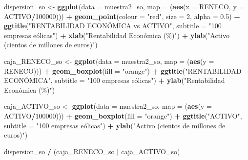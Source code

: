 \documentclass[
]{book}
\newenvironment{Shaded}{\begin{snugshade}}{\end{snugshade}}
\newcommand{\AttributeTok}[1]{\textcolor[rgb]{0.13,0.29,0.53}{#1}}
\newcommand{\DecValTok}[1]{\textcolor[rgb]{0.00,0.00,0.81}{#1}}
\newcommand{\FloatTok}[1]{\textcolor[rgb]{0.00,0.00,0.81}{#1}}
\newcommand{\FunctionTok}[1]{\textcolor[rgb]{0.13,0.29,0.53}{\textbf{#1}}}
\newcommand{\NormalTok}[1]{#1}
\newcommand{\OtherTok}[1]{\textcolor[rgb]{0.56,0.35,0.01}{#1}}
\newcommand{\SpecialCharTok}[1]{\textcolor[rgb]{0.81,0.36,0.00}{\textbf{#1}}}
\newcommand{\StringTok}[1]{\textcolor[rgb]{0.31,0.60,0.02}{#1}}
\begin{document}
\begin{Shaded}
\begin{Highlighting}[]
\NormalTok{dispersion\_so }\OtherTok{\textless{}{-}} \FunctionTok{ggplot}\NormalTok{(}\AttributeTok{data =}\NormalTok{ muestra2\_so, }\AttributeTok{map =}\NormalTok{ (}\FunctionTok{aes}\NormalTok{(}\AttributeTok{x =}\NormalTok{ RENECO,}
                                                       \AttributeTok{y =}\NormalTok{ ACTIVO}\SpecialCharTok{/}\DecValTok{100000}\NormalTok{))) }\SpecialCharTok{+} 
  \FunctionTok{geom\_point}\NormalTok{(}\AttributeTok{colour =} \StringTok{"red"}\NormalTok{, }\AttributeTok{size =} \DecValTok{2}\NormalTok{, }\AttributeTok{alpha =} \FloatTok{0.5}\NormalTok{) }\SpecialCharTok{+}
  \FunctionTok{ggtitle}\NormalTok{(}\StringTok{"RENTABILIDAD ECONÓMICA vs ACTIVO"}\NormalTok{,}
          \AttributeTok{subtitle =} \StringTok{"100 empresas eólicas"}\NormalTok{) }\SpecialCharTok{+} 
  \FunctionTok{xlab}\NormalTok{(}\StringTok{"Rentabilidad Económica (\%)"}\NormalTok{) }\SpecialCharTok{+} 
  \FunctionTok{ylab}\NormalTok{(}\StringTok{"Activo (cientos de millones de euros)"}\NormalTok{) }

\NormalTok{caja\_RENECO\_so }\OtherTok{\textless{}{-}} \FunctionTok{ggplot}\NormalTok{(}\AttributeTok{data =}\NormalTok{ muestra2\_so, }\AttributeTok{map =}\NormalTok{ (}\FunctionTok{aes}\NormalTok{(}\AttributeTok{y =}\NormalTok{ RENECO))) }\SpecialCharTok{+}
  \FunctionTok{geom\_boxplot}\NormalTok{(}\AttributeTok{fill =} \StringTok{"orange"}\NormalTok{) }\SpecialCharTok{+}
  \FunctionTok{ggtitle}\NormalTok{(}\StringTok{"RENTABILIDAD ECONÓMICA"}\NormalTok{,}
          \AttributeTok{subtitle =} \StringTok{"100 empresas eólicas"}\NormalTok{) }\SpecialCharTok{+}
  \FunctionTok{ylab}\NormalTok{(}\StringTok{"Rentabilidad Económica (\%)"}\NormalTok{)}

\NormalTok{caja\_ACTIVO\_so }\OtherTok{\textless{}{-}} \FunctionTok{ggplot}\NormalTok{(}\AttributeTok{data =}\NormalTok{ muestra2\_so, }\AttributeTok{map =}\NormalTok{ (}\FunctionTok{aes}\NormalTok{(}\AttributeTok{y =}\NormalTok{ ACTIVO}\SpecialCharTok{/}\DecValTok{100000}\NormalTok{))) }\SpecialCharTok{+}
  \FunctionTok{geom\_boxplot}\NormalTok{(}\AttributeTok{fill =} \StringTok{"orange"}\NormalTok{) }\SpecialCharTok{+}
  \FunctionTok{ggtitle}\NormalTok{(}\StringTok{"ACTIVO"}\NormalTok{,}
          \AttributeTok{subtitle =} \StringTok{"100 empresas eólicas"}\NormalTok{) }\SpecialCharTok{+}
  \FunctionTok{ylab}\NormalTok{(}\StringTok{"Activo (cientos de millones de euros)"}\NormalTok{)}

\NormalTok{dispersion\_so }\SpecialCharTok{/}\NormalTok{ (caja\_RENECO\_so }\SpecialCharTok{|}\NormalTok{ caja\_ACTIVO\_so)}
\end{Highlighting}
\end{Shaded}
\end{document}
